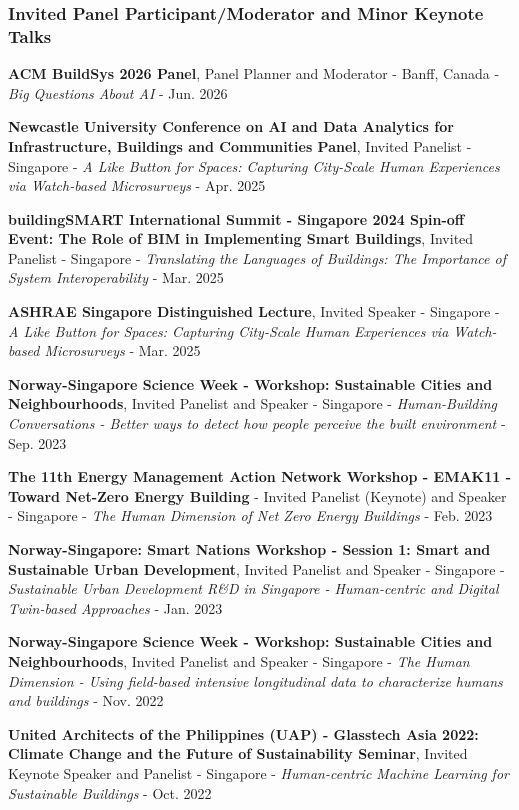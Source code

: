 \documentclass[10pt,a4paper]{article}
\begin{document}
\begin{small}
\subsubsection*{Invited Panel Participant/Moderator and Minor Keynote Talks}
\begin{etaremune}
\item
\textbf{ACM BuildSys 2026 Panel}, Panel Planner and Moderator - Banff, Canada - \emph{Big Questions About AI} - Jun. 2026
\item
\textbf{Newcastle University Conference on AI and Data Analytics for Infrastructure, Buildings and Communities Panel}, Invited Panelist - Singapore - \emph{A Like Button for Spaces: Capturing City-Scale Human Experiences via Watch-based Microsurveys} - Apr. 2025
\item
\textbf{buildingSMART International Summit - Singapore 2024 Spin-off Event: The Role of BIM in Implementing Smart Buildings}, Invited Panelist - Singapore - \emph{Translating the Languages of Buildings: The Importance of System Interoperability} - Mar. 2025
\item
\textbf{ASHRAE Singapore Distinguished Lecture}, Invited Speaker - Singapore - \emph{A Like Button for Spaces: Capturing City-Scale Human Experiences via Watch-based Microsurveys} - Mar. 2025
\item
\textbf{Norway-Singapore Science Week - Workshop: Sustainable Cities and Neighbourhoods}, Invited Panelist and Speaker - Singapore - \emph{Human-Building Conversations - Better ways to detect how people perceive the built environment} - Sep. 2023
\item
\textbf{The 11th Energy Management Action Network Workshop - EMAK11 - Toward Net-Zero Energy Building} - Invited Panelist (Keynote) and Speaker - Singapore - \emph{The Human Dimension of Net Zero Energy Buildings} - Feb. 2023
\item
\textbf{Norway-Singapore: Smart Nations Workshop - Session 1: Smart and Sustainable Urban Development}, Invited Panelist and Speaker - Singapore - \emph{Sustainable Urban Development R\&D in Singapore - Human-centric and Digital Twin-based Approaches} - Jan. 2023
\item
\textbf{Norway-Singapore Science Week - Workshop: Sustainable Cities and Neighbourhoods}, Invited Panelist and Speaker - Singapore - \emph{The Human Dimension - Using field-based intensive longitudinal data to characterize humans and buildings} - Nov. 2022
\item
\textbf{United Architects of the Philippines (UAP) - Glasstech Asia 2022: Climate Change and the Future of Sustainability Seminar}, Invited Keynote Speaker and Panelist - Singapore - \emph{Human-centric Machine Learning for Sustainable Buildings} - Oct. 2022 

\end{etaremune}
\end{small}
\end{document}
